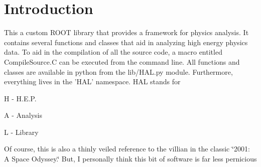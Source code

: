 \hypertarget{index_intro_sec}{}\section{Introduction}\label{index_intro_sec}
This a custom R\-O\-O\-T library that provides a framework for physics analysis. It contains several functions and classes that aid in analyzing high energy physics data. To aid in the compilation of all the source code, a macro entitled {\ttfamily Compile\-Source.\-C} can be executed from the command line. All functions and classes are available in python from the {\ttfamily lib/\-H\-A\-L.\-py} module. Furthermore, everything lives in the 'H\-A\-L' namespace. H\-A\-L stands for\par
 H -\/ H.\-E.\-P.\par
 A -\/ Analysis\par
 L -\/ Library\par
 Of course, this is also a thinly veiled reference to the villian in the classic \char`\"{}2001\-: A Space Odyssey.\char`\"{} But, I personally think this bit of software is far less pernicious 